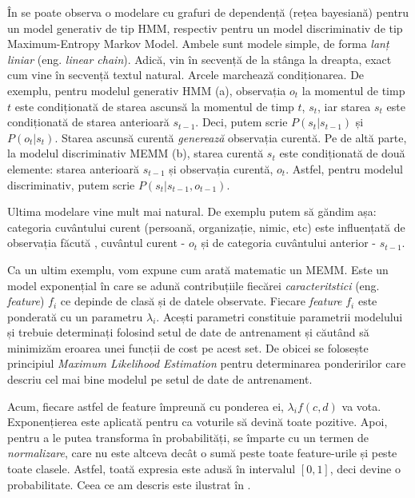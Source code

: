 
În  se poate observa o modelare cu grafuri de dependență (rețea bayesiană) pentru un model generativ de tip HMM, respectiv pentru un model discriminativ de tip Maximum-Entropy Markov Model. Ambele sunt modele simple, de forma \textit{lanț liniar} (eng. \textit{linear chain}). Adică, vin în secvență de la stânga la dreapta, exact cum vine în secvență textul natural. Arcele marchează condiționarea. De exemplu, pentru modelul generativ HMM (a), observația $o_t$ la momentul de timp $t$ este condiționată de starea ascunsă la momentul de timp $t$, $s_t$, iar starea $s_t$ este condiționată de starea anterioară $s_{t-1}$. Deci, putem scrie $P(s_t|s_{t-1})$ și $P(o_t|s_t)$. Starea ascunsă curentă \textit{generează} observația curentă. Pe de altă parte, la modelul discriminativ MEMM (b), starea curentă $s_t$ este condiționată de două elemente: starea anterioară $s_{t - 1}$ și observația curentă,  $o_t$. Astfel, pentru modelul discriminativ, putem scrie $P(s_t|s_{t - 1}, o_{t - 1})$.

Ultima modelare vine mult mai natural. De exemplu putem să găndim așa: categoria cuvântului curent (persoană, organizație, nimic, etc) este influențată de observația făcută , cuvântul curent - $o_t$ și de categoria cuvântului anterior - $s_{t-1}$.


Ca un ultim exemplu, vom expune cum arată matematic un MEMM. Este un model exponențial în care se adună contribuțiile fiecărei \textit{caracteritstici} (eng. \textit{feature}) $f_i$ ce depinde de clasă și de datele observate. Fiecare \textit{feature} $f_i$ este ponderată cu un parametru $\lambda_{i}$. Acești parametri constituie parametrii modelului și trebuie determinați folosind setul de date de antrenament și căutând să minimizăm eroarea unei funcții de cost pe acest set. De obicei se folosește principiul \textit{Maximum Likelihood Estimation} pentru determinarea ponderirilor care descriu cel mai bine modelul pe setul de date de antrenament.

Acum, fiecare astfel de feature împreună cu ponderea ei, $\lambda_{i} f(c,d) $ va vota. Exponențierea este aplicată pentru ca voturile să devină toate pozitive. Apoi, pentru a le putea transforma în probabilități, se împarte cu un termen de \textit{normalizare}, care nu este altceva decât o sumă peste toate feature-urile și peste toate clasele. Astfel, toată expresia este adusă în intervalul $[0,1]$, deci devine o probabilitate. Ceea ce am descris este ilustrat în .


